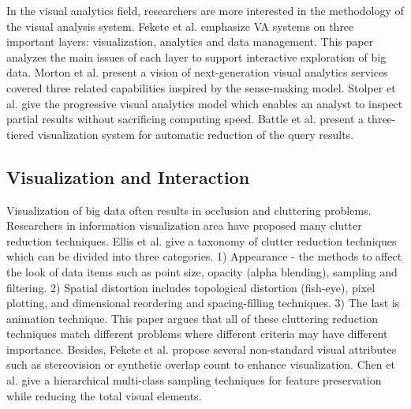 \documentclass[journal]{vgtc}                %
\begin{document}
{In the visual analytics field, researchers are more interested in the methodology of the visual analysis system. Fekete et al. \cite{Fekete2013} emphasize VA systems  on three important layers: visualization, analytics and data management. This paper analyzes the main issues of each layer to support interactive exploration of big data. Morton et al. \cite{morton2014support} present a vision of next-generation visual analytics services covered three related capabilities inspired by the sense-making model. Stolper et al. \cite{Stolper2014} give the progressive visual analytics model which enables an analyst to inspect partial results without sacrificing computing speed. Battle et al. \cite{battle2013dynamic} present a three-tiered visualization system for automatic reduction of the query results.
 


\subsection{Visualization and Interaction}
Visualization of big data often results in occlusion and cluttering problems.  Researchers in information visualization area have proposed many clutter reduction techniques. Ellis et al. \cite{Ellis2007} give a taxonomy of clutter reduction techniques which can be divided into three categories. 1) Appearance - the methods to affect the look of data items such as point size, opacity (alpha blending), sampling and filtering. 2) Spatial distortion includes topological distortion (fish-eye), pixel plotting, and dimensional reordering and spacing-filling techniques. 3) The last is animation technique. This paper argues that all of these cluttering reduction techniques match different problems where different criteria may have different importance. Besides, Fekete et al. \cite{Fekete:2002} propose several non-standard visual attributes such as stereovision or synthetic overlap count to enhance visualization. Chen et al. \cite{chen2014visual} give a hierarchical multi-class sampling techniques for feature preservation while reducing the total visual elements.

}
\end{document}
